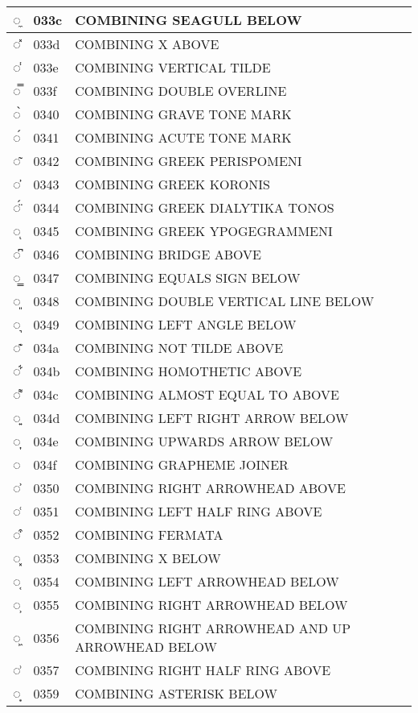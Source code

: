 \documentclass[12pt,letterpaper,openany]{book}
\begin{document}
\begin{center}
\begin{supertabular}{|m{0.25in}|m{0.5in}|m{4in}|}
			◌̼ & 033c & COMBINING SEAGULL BELOW\\\hline
			◌̽ & 033d & COMBINING X ABOVE\\\hline
			◌̾ & 033e & COMBINING VERTICAL TILDE\\\hline
			◌̿ & 033f & COMBINING DOUBLE OVERLINE\\\hline
			◌̀ & 0340 & COMBINING GRAVE TONE MARK\\\hline
			◌́ & 0341 & COMBINING ACUTE TONE MARK\\\hline
			◌͂ & 0342 & COMBINING GREEK PERISPOMENI\\\hline
			◌̓ & 0343 & COMBINING GREEK KORONIS\\\hline
			◌̈́ & 0344 & COMBINING GREEK DIALYTIKA TONOS\\\hline
			◌ͅ & 0345 & COMBINING GREEK YPOGEGRAMMENI\\\hline
			◌͆ & 0346 & COMBINING BRIDGE ABOVE\\\hline
			◌͇ & 0347 & COMBINING EQUALS SIGN BELOW\\\hline
			◌͈ & 0348 & COMBINING DOUBLE VERTICAL LINE BELOW\\\hline
			◌͉ & 0349 & COMBINING LEFT ANGLE BELOW\\\hline
			◌͊ & 034a & COMBINING NOT TILDE ABOVE\\\hline
			◌͋ & 034b & COMBINING HOMOTHETIC ABOVE\\\hline
			◌͌ & 034c & COMBINING ALMOST EQUAL TO ABOVE\\\hline
			◌͍ & 034d & COMBINING LEFT RIGHT ARROW BELOW\\\hline
			◌͎ & 034e & COMBINING UPWARDS ARROW BELOW\\\hline
			◌͏ & 034f & COMBINING GRAPHEME JOINER\\\hline
			◌͐ & 0350 & COMBINING RIGHT ARROWHEAD ABOVE\\\hline
			◌͑ & 0351 & COMBINING LEFT HALF RING ABOVE\\\hline
			◌͒ & 0352 & COMBINING FERMATA\\\hline
			◌͓ & 0353 & COMBINING X BELOW\\\hline
			◌͔ & 0354 & COMBINING LEFT ARROWHEAD BELOW\\\hline
			◌͕ & 0355 & COMBINING RIGHT ARROWHEAD BELOW\\\hline
			◌͖ & 0356 & COMBINING RIGHT ARROWHEAD AND UP ARROWHEAD BELOW\\\hline
			◌͗ & 0357 & COMBINING RIGHT HALF RING ABOVE\\\hline
			◌͙ & 0359 & COMBINING ASTERISK BELOW\\\hline

\end{supertabular}
\end{center}
\end{document}
